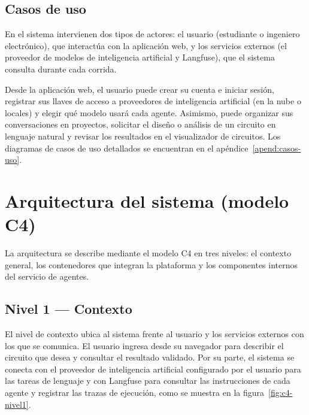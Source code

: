 \subsection{Casos de uso}
\label{subsec:prop-casos-uso}

En el sistema intervienen dos tipos de actores: el usuario (estudiante o ingeniero electrónico), que interactúa con la aplicación web, y los servicios externos (el proveedor de modelos de inteligencia artificial y Langfuse), que el sistema consulta durante cada corrida.

Desde la aplicación web, el usuario puede crear su cuenta e iniciar sesión, registrar sus llaves de acceso a proveedores de inteligencia artificial (en la nube o locales) y elegir qué modelo usará cada agente. Asimismo, puede organizar sus conversaciones en proyectos, solicitar el diseño o análisis de un circuito en lenguaje natural y revisar los resultados en el visualizador de circuitos. Los diagramas de casos de uso detallados se encuentran en el apéndice~\ref{apend:casos-uso}.

\section{Arquitectura del sistema (modelo C4)}
\label{sec:prop-c4}

La arquitectura se describe mediante el modelo C4 en tres niveles: el contexto general, los contenedores que integran la plataforma y los componentes internos del servicio de agentes.

\subsection{Nivel 1 — Contexto}
\label{subsec:prop-c4-nivel1}

El nivel de contexto ubica al sistema frente al usuario y los servicios externos con los que se comunica. El usuario ingresa desde su navegador para describir el circuito que desea y consultar el resultado validado. Por su parte, el sistema se conecta con el proveedor de inteligencia artificial configurado por el usuario para las tareas de lenguaje y con Langfuse para consultar las instrucciones de cada agente y registrar las trazas de ejecución, como se muestra en la figura~\ref{fig:c4-nivel1}.

